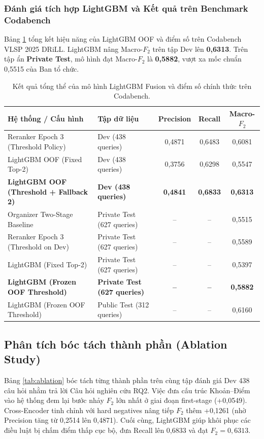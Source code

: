 \documentclass[12pt,a4paper]{article}
\begin{document}
\subsubsection{Đánh giá tích hợp LightGBM và Kết quả trên Benchmark Codabench}
Bảng \ref{tab:lgbm_codabench} tổng kết hiệu năng của LightGBM OOF và điểm số trên Codabench VLSP 2025 DRiLL. LightGBM nâng Macro-$F_2$ trên tập Dev lên \textbf{0,6313}. Trên tập ẩn \textbf{Private Test}, mô hình đạt Macro-$F_2$ là \textbf{0,5882}, vượt xa mốc chuẩn 0,5515 của Ban tổ chức.

\begin{table}[htbp]
\centering
\caption{Kết quả tổng thể của mô hình LightGBM Fusion và điểm số chính thức trên Codabench.}
\label{tab:lgbm_codabench}
\footnotesize
\begin{tabularx}{\textwidth}{X l c c c}
\toprule
\textbf{Hệ thống / Cấu hình} & \textbf{Tập dữ liệu} & \textbf{Precision} & \textbf{Recall} & \textbf{Macro-$F_2$} \\
\midrule
Reranker Epoch 3 (Threshold Policy) & Dev (438 queries) & 0,4871 & 0,6483 & 0,6081 \\
LightGBM OOF (Fixed Top-2) & Dev (438 queries) & 0,3756 & 0,6298 & 0,5547 \\
\textbf{LightGBM OOF (Threshold + Fallback 2)} & \textbf{Dev (438 queries)} & \textbf{0,4841} & \textbf{0,6833} & \textbf{0,6313} \\
\midrule
Organizer Two-Stage Baseline \cite{vlsp2025drill} & Private Test (627 queries) & -- & -- & 0,5515 \\
Reranker Epoch 3 (Threshold on Dev) & Private Test (627 queries) & -- & -- & 0,5589 \\
LightGBM (Fixed Top-2) & Private Test (627 queries) & -- & -- & 0,5397 \\
\textbf{LightGBM (Frozen OOF Threshold)} & \textbf{Private Test (627 queries)} & \textbf{--} & \textbf{--} & \textbf{0,5882} \\
LightGBM (Frozen OOF Threshold) & Public Test (312 queries) & -- & -- & 0,6160 \\
\bottomrule
\end{tabularx}
\end{table}

\subsection{Phân tích bóc tách thành phần (Ablation Study)}
Bảng \ref{tab:ablation} bóc tách từng thành phần trên cùng tập đánh giá Dev 438 câu hỏi nhằm trả lời Câu hỏi nghiên cứu RQ2. Việc đưa cấu trúc Khoản--Điểm vào hệ thống đem lại bước nhảy $F_2$ lớn nhất ở giai đoạn first-stage (+0,0549). Cross-Encoder tinh chỉnh với hard negatives nâng tiếp $F_2$ thêm +0,1261 (nhờ Precision tăng từ 0,2514 lên 0,4871). Cuối cùng, LightGBM giúp khôi phục các điều luật bị chấm điểm thấp cục bộ, đưa Recall lên 0,6833 và đạt $F_2 = 0,6313$.
\end{document}
